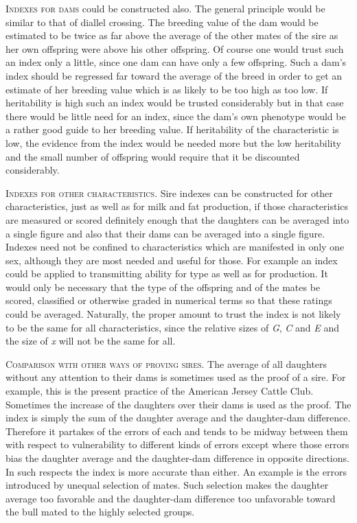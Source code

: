\textsc{Indexes for dams} could be constructed also. The general principle
would be similar to that of diallel crossing. The breeding value of the
dam would be estimated to be twice as far above the average of the
other mates of the sire as her own offspring were above his other offspring.
Of course one would trust such an index only a little, since
one dam can have only a few offspring. Such a dam's index should be
regressed far toward the average of the breed in order to get an estimate
of her breeding value which is as likely to be too high as too low.
If heritability is high such an index would be trusted considerably but
in that case there would be little need for an index, since the dam's
own phenotype would be a rather good guide to her breeding value. If
heritability of the characteristic is low, the evidence from the index
would be needed more but the low heritability and the small number
of offspring would require that it be discounted considerably.

\textsc{Indexes for other characteristics}. Sire indexes can be constructed
for other characteristics, just as well as for milk and fat production, if
those characteristics are measured or scored definitely enough that the
daughters can be averaged into a single figure and also that their dams
can be averaged into a single figure. Indexes need not be confined to
characteristics which are manifested in only one sex, although they are
most needed and useful for those. For example an index could be
applied to transmitting ability for type as well as for production. It
would only be necessary that the type of the offspring and of the mates
be scored, classified or otherwise graded in numerical terms so that
these ratings could be averaged. Naturally, the proper amount to trust
the index is not likely to be the same for all characteristics, since the
relative sizes of \textit{G}, \textit{C} and \textit{E} and the size of
\textit{x} will not be the same for all.

\nowidow
\textsc{Comparison with other ways of proving sires}. The average of all
daughters without any attention to their dams is sometimes used as the
proof of a sire. For example, this is the present practice of the American
Jersey Cattle Club. Sometimes the increase of the daughters over their
dams is used as the proof. The index is simply the sum of the daughter
average and the daughter-dam difference. Therefore it partakes of the
errors of each and tends to be midway between them with respect to
vulnerability to different kinds of errors except where those errors bias
the daughter average and the daughter-dam difference in opposite
directions. In such respects the index is more accurate than either. An
example is the errors introduced by unequal selection of mates. Such
selection makes the daughter average too favorable and the daughter-dam
difference too unfavorable toward the bull mated to the highly
selected groups.

